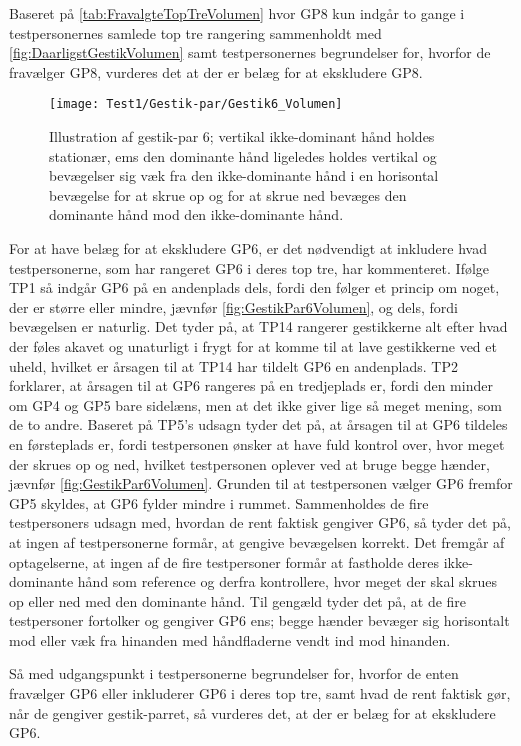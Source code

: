 %
Baseret på \autoref{tab:FravalgteTopTreVolumen} hvor GP8 kun indgår to gange i testpersonernes samlede top tre rangering sammenholdt med \autoref{fig:DaarligstGestikVolumen} samt testpersonernes begrundelser for, hvorfor de fravælger GP8, vurderes det at der er belæg for at ekskludere GP8. 
%
\begin{figure}[H]
	\centering
	\texttt{[image: Test1/Gestik-par/Gestik6\_Volumen]}
	\caption{Illustration af gestik-par 6; vertikal ikke-dominant hånd holdes stationær, ems den dominante hånd ligeledes holdes vertikal og bevægelser sig væk fra den ikke-dominante hånd i en horisontal bevægelse for at skrue op og for at skrue ned bevæges den dominante hånd mod den ikke-dominante hånd.}
	\label{fig:GestikPar6Volumen}
\end{figure}
\noindent
% 
For at have belæg for at ekskludere GP6, er det nødvendigt at inkludere hvad testpersonerne, som har rangeret GP6 i deres top tre, har kommenteret. Ifølge TP1 så indgår GP6 på en andenplads dels, fordi den følger et princip om noget, der er større eller mindre, jævnfør \autoref{fig:GestikPar6Volumen}, og dels, fordi bevægelsen er naturlig. Det tyder på, at TP14 rangerer gestikkerne alt efter hvad der føles akavet og unaturligt i frygt for at komme til at lave gestikkerne ved et uheld, hvilket er årsagen til at TP14 har tildelt GP6 en andenplads. TP2 forklarer, at årsagen til at GP6 rangeres på en tredjeplads er, fordi den minder om GP4 og GP5 bare sidelæns, men at det ikke giver lige så meget mening, som de to andre. Baseret på TP5's udsagn tyder det på, at årsagen til at GP6 tildeles en førsteplads er, fordi testpersonen ønsker at have fuld kontrol over, hvor meget der skrues op og ned, hvilket testpersonen oplever ved at bruge begge hænder, jævnfør \autoref{fig:GestikPar6Volumen}. Grunden til at testpersonen vælger GP6 fremfor GP5 skyldes, at GP6 fylder mindre i rummet. Sammenholdes de fire testpersoners udsagn med, hvordan de rent faktisk gengiver GP6, så tyder det på, at ingen af testpersonerne formår, at gengive bevægelsen korrekt. Det fremgår af optagelserne, at ingen af de fire testpersoner formår at fastholde deres ikke-dominante hånd som reference og derfra kontrollere, hvor meget der skal skrues op eller ned med den dominante hånd. Til gengæld tyder det på, at de fire testpersoner fortolker og gengiver GP6 ens; begge hænder bevæger sig horisontalt mod eller væk fra hinanden med håndfladerne vendt ind mod hinanden. 

Så med udgangspunkt i testpersonerne begrundelser for, hvorfor de enten fravælger GP6 eller inkluderer GP6 i deres top tre, samt hvad de rent faktisk gør, når de gengiver gestik-parret, så vurderes det, at der er belæg for at ekskludere GP6.  





